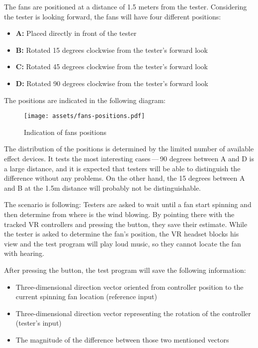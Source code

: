 The fans are positioned at a distance of 1.5 meters from the tester.
Considering the tester is looking forward, the fans will
have four different positions:


\begin{itemize}

\item \textbf{A:} Placed directly in front of the tester

\item \textbf{B:} Rotated 15 degrees clockwise from the tester’s forward look

\item \textbf{C:} Rotated 45 degrees clockwise from the tester’s forward look

\item \textbf{D:} Rotated 90 degrees clockwise from the tester’s forward look

\end{itemize}


The positions are indicated in the following diagram:


\begin{figure}[h]{}
\centering\texttt{[image: assets/fans-positions.pdf]}
\caption{Indication of fans positions}

\end{figure}

The distribution of the positions is determined by the limited number of
available effect devices. It tests the most interesting cases — 90 degrees between A and D is a large distance, and it is expected that testers
will be able to distinguish the difference without any problems.
On the other hand, the 15 degrees between
A and B at the 1.5m distance will probably not be distinguishable.



The scenario is following: Testers are asked to wait until a fan start spinning
and then determine from where is the wind blowing. By pointing there with the
tracked VR controllers and pressing the button, they save their estimate.
While the tester is asked to determine the fan’s position, the VR headset
blocks his view and the test program will play loud music, so they
cannot locate the fan with hearing.


After pressing the button, the test program will save the following information:


\begin{itemize}

\item Three-dimensional direction vector oriented from controller position to
the current spinning fan location (reference input)

\item Three-dimensional direction vector representing the rotation of the
controller (tester’s input)

\item The magnitude of the difference between those two mentioned vectors

\end{itemize}


